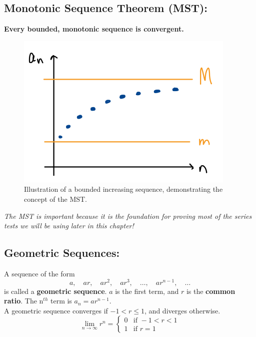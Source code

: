 \documentclass[10pt]{article}
\begin{document}



\subsection*{Monotonic Sequence Theorem (MST):}


\textbf{Every bounded, monotonic sequence is convergent.}\\

\begin{figure}[!h]
\includegraphics[width=.6\textwidth]{Ch8s1-MST.png}
\caption{Illustration of a bounded increasing sequence, demonstrating the concept of the MST.}
\end{figure}

\textit{The MST is important because it is the foundation for proving most of the series tests we will be using later in this chapter!}


\vspace*{.1in}

\subsection*{Geometric Sequences:}
 A sequence of the form
\[ a, \quad  ar, \quad  ar^2, \quad  ar^3, \quad  \ldots, \quad  ar^{n-1}, \quad \ldots\]
is called a \textbf{geometric sequence}. \(a\) is the first term, and \(r\) is the \textbf{common ratio}. The n\(^{th}\) term is \(a_n=ar^{n-1}\).\\

A geometric sequence converges if \(-1<r\leq 1\), and diverges otherwise.
\[
\lim_{n\rightarrow \infty} r^n = \left\lbrace\begin{matrix}
0 & \text{if } -1 < r < 1\\
1 & \text{if } r =1
\end{matrix}\right.
\]
\end{document}
